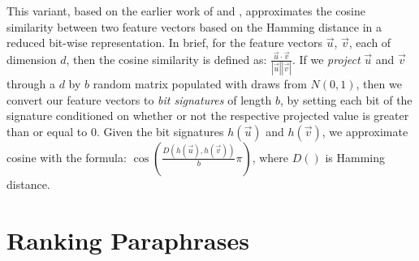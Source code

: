 \documentclass[11pt]{article}
\begin{document}
This variant, based on the earlier work of  and
, approximates the cosine similarity between two feature
vectors based on the Hamming distance in a reduced bit-wise representation. In
brief, for the feature vectors $\vec{u}$, $\vec{v}$, each of dimension $d$, then
the cosine similarity is defined as: $\frac{\vec{u} \cdot
  \vec{v}}{|\vec{u}||\vec{v}|}$. If we \emph{project} $\vec{u}$ and $\vec{v}$
through a $d$ by $b$ random matrix populated with draws from $N(0,1)$, then we
convert our feature vectors to \emph{bit signatures} of length $b$, by setting
each bit of the signature conditioned on whether or not the respective projected
value is greater than or equal to 0. Given the bit signatures $h(\vec{u})$ and
$h(\vec{v})$, we approximate cosine with the formula:
$\cos(\frac{D(h(\vec{u}),h(\vec{v}))}{b}\pi)$, where $D()$ is Hamming distance.

\vspace{-.1cm}
\section{Ranking Paraphrases}
\vspace{-.1cm}
\end{document}
